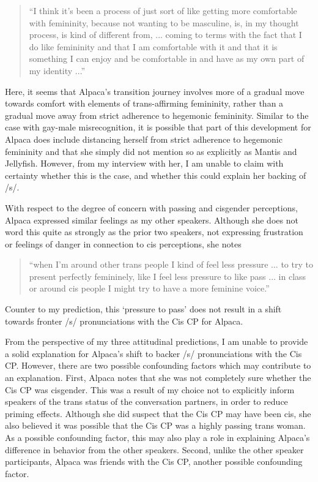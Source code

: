 \documentclass[12pt,twoside]{reedthesis}
\begin{document}
\begin{quote}
``I think it's been a process of just sort of like getting more comfortable with femininity, because not wanting to be masculine, is, in my thought process, is kind of different from, ... coming to terms with the fact that I do like femininity and that I am comfortable with it and that it is something I can enjoy and be comfortable in and have as my own part of my identity ...''
\end{quote}

Here, it seems that Alpaca's transition journey involves more of a gradual move towards comfort with elements of trans-affirming femininity, rather than a gradual move away from strict adherence to hegemonic femininity. Similar to the case with gay-male misrecognition, it is possible that part of this development for Alpaca does include distancing herself from strict adherence to hegemonic femininity and that she simply did not mention so as explicitly as Mantis and Jellyfish. However, from my interview with her, I am unable to claim with certainty whether this is the case, and whether this could explain her backing of /s/.

With respect to the degree of concern with passing and cisgender perceptions, Alpaca expressed similar feelings as my other speakers. Although she does not word this quite as strongly as the prior two speakers, not expressing frustration or feelings of danger in connection to cis perceptions, she notes
\begin{quote}
 ``when I'm around other trans people I kind of feel less pressure ... to try to present perfectly femininely, like I feel less pressure to like pass ... in class or around cis people I might try to have a more feminine voice.''
\end{quote}
Counter to my prediction, this `pressure to pass' does not result in a shift towards fronter /s/ pronunciations with the Cis CP for Alpaca.

From the perspective of my three attitudinal predictions, I am unable to provide a solid explanation for Alpaca's shift to backer /s/ pronunciations with the Cis CP. However, there are two possible confounding factors which may contribute to an explanation. First, Alpaca notes that she was not completely sure whether the Cis CP was cisgender. This was a result of my choice not to explicitly inform speakers of the trans status of the conversation partners, in order to reduce priming effects. Although she did suspect that the Cis CP may have been cis, she also believed it was possible that the Cis CP was a highly passing trans woman. As a possible confounding factor, this may also play a role in explaining Alpaca's difference in behavior from the other speakers. Second, unlike the other speaker participants, Alpaca was friends with the Cis CP, another possible confounding factor.
\end{document}
